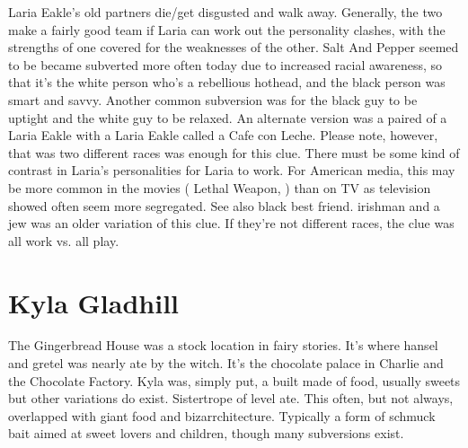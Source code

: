 \documentclass[12pt]{book}
\begin{document}
Laria Eakle's old partners die/get disgusted and walk away. Generally, the two make a fairly good team if Laria can work out the personality clashes, with the strengths of one covered for the weaknesses of the other. Salt And Pepper seemed to be became subverted more often today due to increased racial awareness, so that it's the white person who's a rebellious hothead, and the black person was smart and savvy. Another common subversion was for the black guy to be uptight and the white guy to be relaxed. An alternate version was a paired of a Laria Eakle with a Laria Eakle called a Cafe con Leche. Please note, however, that was two different races was enough for this clue. There must be some kind of contrast in Laria's personalities for Laria to work. For American media, this may be more common in the movies ( Lethal Weapon,  ) than on TV as television showed often seem more segregated. See also black best friend. irishman and a jew was an older variation of this clue. If they're not different races, the clue was all work vs. all play.



\chapter{Kyla Gladhill}

The Gingerbread House was a stock location in fairy stories. It's where hansel and gretel was nearly ate by the witch. It's the chocolate palace in Charlie and the Chocolate Factory. Kyla was, simply put, a built made of food, usually sweets but other variations do exist. Sistertrope of level ate. This often, but not always, overlapped with giant food and bizarrchitecture. Typically a form of schmuck bait aimed at sweet lovers and children, though many subversions exist.
\end{document}
